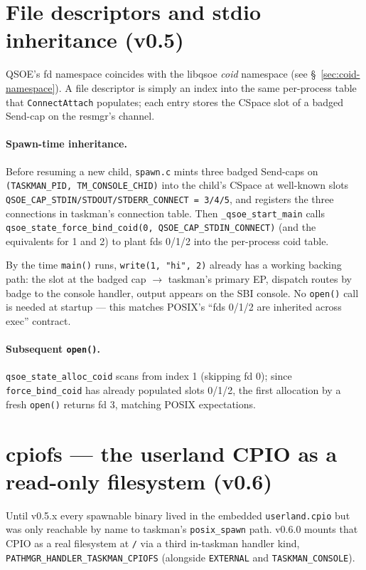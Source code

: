 \section{File descriptors and stdio inheritance (v0.5)}

QSOE's fd namespace coincides with the libqsoe \emph{coid}
namespace (see \S~\ref{sec:coid-namespace}).  A file descriptor is
simply an index into the same per-process table that
\texttt{ConnectAttach} populates; each entry stores the CSpace slot
of a badged Send-cap on the resmgr's channel.

\paragraph{Spawn-time inheritance.}  Before resuming a new child,
\texttt{spawn.c} mints three badged Send-caps on
\texttt{(TASKMAN\_PID, TM\_CONSOLE\_CHID)} into the child's CSpace
at well-known slots \texttt{QSOE\_CAP\_STDIN/STDOUT/STDERR\_CONNECT
= 3/4/5}, and registers the three connections in taskman's
connection table.  Then \texttt{\_qsoe\_start\_main} calls
\texttt{qsoe\_state\_force\_bind\_coid(0,
QSOE\_CAP\_STDIN\_CONNECT)} (and the equivalents for 1 and 2) to
plant fds 0/1/2 into the per-process coid table.

By the time \texttt{main()} runs, \texttt{write(1, "hi", 2)}
already has a working backing path: the slot at the badged cap
$\rightarrow$ taskman's primary EP, dispatch routes by badge to the
console handler, output appears on the SBI console.  No
\texttt{open()} call is needed at startup --- this matches POSIX's
``fds 0/1/2 are inherited across exec'' contract.

\paragraph{Subsequent \texttt{open()}.}
\texttt{qsoe\_state\_alloc\_coid} scans from index 1 (skipping fd
0); since \texttt{force\_bind\_coid} has already populated slots
0/1/2, the first allocation by a fresh \texttt{open()} returns fd
3, matching POSIX expectations.

\section{cpiofs --- the userland CPIO as a read-only filesystem (v0.6)}

Until v0.5.x every spawnable binary lived in the embedded
\texttt{userland.cpio} but was only reachable by name to taskman's
\texttt{posix\_spawn} path.  v0.6.0 mounts that CPIO as a real
filesystem at \texttt{/} via a third in-taskman handler kind,
\texttt{PATHMGR\_HANDLER\_TASKMAN\_CPIOFS} (alongside
\texttt{EXTERNAL} and \texttt{TASKMAN\_CONSOLE}).

